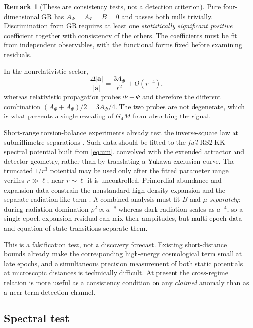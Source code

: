\documentclass[11pt,a4paper]{article}
\theoremstyle{plain}
\theoremstyle{definition}
\newtheorem{remark}[theorem]{Remark}
\begin{document}
\begin{remark}[These are consistency tests, not a detection criterion]
Pure four-dimensional GR has $A_\Phi=A_\Psi=B=0$ and passes both nulls
trivially. Discrimination from GR requires at least one \emph{statistically
significant positive} coefficient together with consistency of the
others. The coefficients must be fit from independent observables, with
the functional forms fixed before examining residuals.
\end{remark}

In the nonrelativistic sector,
\begin{equation}
\label{eq:accel_frac}
\frac{\Delta|\mathbf a|}{|\mathbf a|}
=\frac{3A_\Phi}{r^2}+O(r^{-4}),
\end{equation}
whereas relativistic propagation probes $\Phi+\Psi$ and therefore the
different combination $(A_\Phi+A_\Psi)/2=3A_\Phi/4$. The two probes are
not degenerate, which is what prevents a single rescaling of $G_4M$ from
absorbing the signal.

Short-range torsion-balance experiments already test the inverse-square
law at submillimetre separations \cite{Lee}. Such data should be fitted
to the \emph{full} RS2 KK spectral potential built from \eqref{eq:um},
convolved with the extended attractor and detector geometry, rather than
by translating a Yukawa exclusion curve. The truncated $1/r^3$ potential
may be used only after the fitted parameter range verifies $r\gg\ell$;
near $r\sim\ell$ it is uncontrolled. Primordial-abundance and expansion
data constrain the nonstandard high-density expansion and the separate
radiation-like term \cite{Ichiki}. A combined analysis must fit $B$ and
$\mu$ \emph{separately}: during radiation domination $\rho^2\propto
a^{-8}$ whereas dark radiation scales as $a^{-4}$, so a single-epoch
expansion residual can mix their amplitudes, but multi-epoch data and
equation-of-state transitions separate them.

This is a falsification test, not a discovery forecast. Existing
short-distance bounds already make the corresponding high-energy
cosmological term small at late epochs, and a simultaneous precision
measurement of both static potentials at microscopic distances is
technically difficult. At present the cross-regime relation is more
useful as a consistency condition on any \emph{claimed} anomaly than as a
near-term detection channel.

\subsection{Spectral test}
\end{document}

